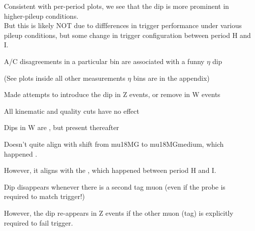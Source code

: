  {
 Consistent with per-period plots, we see that the dip is more prominent in higher-pileup conditions. \\
 But this is likely NOT due to diffferences in trigger performance under various pileup conditions,
 but some change in trigger configuration between period H and I.
}

 {
 \iteb
 \item A/C disagreements in a particular bin are associated with a funny $\eta$ dip
 \item (See plots inside all other measurements $\eta$ bins are in the appendix)
 \item Made attempts to introduce the dip in Z events, or remove in W events
 \iteb
 \item All kinematic and quality cuts have no effect
 \item Dips in W are , but present thereafter
 \iteb
 \item Doesn't quite align with shift from mu18MG to mu18MGmedium, which happened .
 \item However, it aligns with the , which happened between period H and I.
 \itee
 \item Dip disappears whenever there is a second tag muon (even if the probe is required to match trigger!)
 \iteb
 \item However, the dip re-appears in Z events if the other muon (tag) is explicitly required to fail trigger.
 \itee
 \itee
 \itee
}



